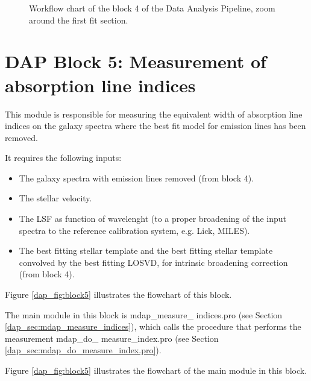\documentclass[11pt]{book}
\begin{document}
\begin{figure}
\begin{center}
\caption{Workflow chart of the block 4 of the Data Analysis Pipeline,
  zoom around the first fit section.}
 \label{dap_fig:block4a}
\end{center}
\end{figure}


\section{DAP Block 5: Measurement of absorption line indices}
\label{dap_sec:block5}

This module is responsible for measuring the equivalent width of
absorption line indices on the galaxy spectra where the best fit model
for emission lines has been removed.

It requires the following inputs:
\begin{itemize}
 
\item The galaxy spectra with emission lines removed (from block 4).

\item The stellar velocity.

  \item The LSF as function of wavelenght (to a proper
broadening of the input spectra to the reference calibration system,
e.g. Lick, MILES).

\item The best fitting stellar template and the best fitting stellar
  template convolved by the best fitting LOSVD, for intrinsic
  broadening correction (from block 4).

\end{itemize}

Figure \ref{dap_fig:block5} illustrates the flowchart of this block.

The main module in this block is mdap\_measure\_ indices.pro (see
Section \ref{dap_sec:mdap_measure_indices}), which calls the procedure
that performs the measurement mdap\_do\_ measure\_index.pro (see
Section \ref{dap_sec:mdap_do_measure_index.pro}).

Figure \ref{dap_fig:block5} illustrates the flowchart of the main module in this block.
\end{document}
